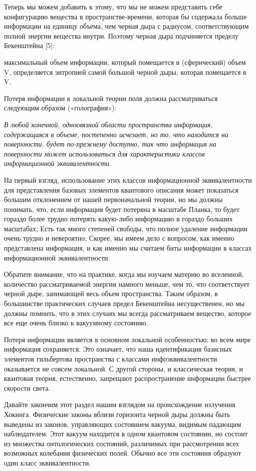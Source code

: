 \documentclass[main.tex]{subfiles}
\begin{document}
Теперь мы можем добавить к этому, что мы не можем представить себе конфигурацию вещества в пространстве-времени, которая бы содержала больше информации на единицу объема, чем черная дыра с радиусом, соответствующим полной энергии вещества внутри. Поэтому черная дыра подчиняется пределу Бекенштейна [5]:

максимальный объем информации, который помещается в (сферический) объем V, определяется энтропией самой большой черной дыры, которая помещается в V.

Потеря информации в локальной теории поля должна рассматриваться следующим образом («голография»):

\textit{В любой конечной, односвязной области пространства информация, содержащаяся в объеме, постепенно исчезает, но то, что находится на поверхности, будет по-прежнему доступно, так что информация на поверхности может использоваться для характеристики классов информационной эквивалентности.}

На первый взгляд, использование этих классов информационной эквивалентности для представления базовых элементов квантового описания может показаться большим отклонением от нашей первоначальной теории, но мы должны понимать, что, если информация будет потеряна в масштабе Планка, то будет гораздо более трудно потерять какую-либо информацию в гораздо больших масштабах; Есть так много степеней свободы, что полное удаление информации очень трудно и невероятно; Скорее, мы имеем дело с вопросом, как именно представлена информация, и как именно мы считаем биты информации в классах информационной эквивалентности.

Обратите внимание, что на практике, когда мы изучаем материю во вселенной, количество рассматриваемой энергии намного меньше, чем то, что соответствует черной дыре, занимающей весь объем пространства. Таким образом, в большинстве практических случаев предел Бекенштейна несущественен, но мы должны помнить, что в этих случаях мы всегда рассматриваем вещество, которое все еще очень близко к вакуумному состоянию.

Потеря информации является в основном локальной особенностью; во всем мире информация сохраняется. Это означает, что наша идентификация базисных элементов гильбертова пространства с классами инфоэквивалентности оказывается не совсем локальной. С другой стороны, и классическая теория, и квантовая теория, естественно, запрещают распространение информации быстрее скорости света.

Давайте закончим этот раздел нашим взглядом на происхождение излучения Хокинга. Физические законы вблизи горизонта черной дыры должны быть выведены из законов, управляющих состоянием вакуума, видимым падающим наблюдателем. Этот вакуум находится в одном квантовом состоянии, но состоит из множества онтологических состояний, различимых при рассмотрении всех возможных колебания физических полей. Обычно все эти состояния образуют один класс эквивалентности.
\end{document}
